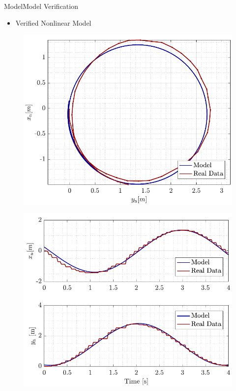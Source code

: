 \begin{frame}{Model}{Model Verification}
    \begin{itemize}
        \item Verified Nonlinear Model
    \end{itemize}
    \begin{minipage}{0.45\linewidth}
        \begin{figure}[H]
            \centering
            \includegraphics[width=1\linewidth]{figures/turn}
        \end{figure}        
    \end{minipage}\hfill      
    \begin{minipage}{0.45\linewidth}
        \begin{figure}[H]
            \centering
            \includegraphics[width=1\linewidth]{figures/turn_time}
        \end{figure}                
    \end{minipage}\hfill \\
\end{frame}







